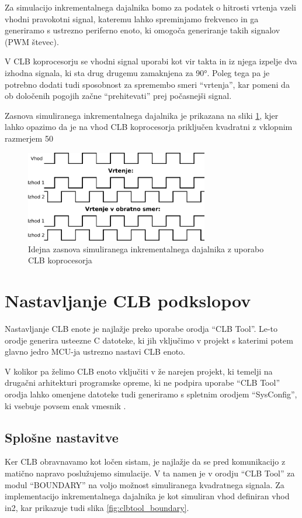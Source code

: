 \documentclass[a4paper]{article}
\begin{document}
\begin{sloppypar}
Za simulacijo inkrementalnega dajalnika bomo za podatek o hitrosti vrtenja vzeli vhodni pravokotni signal, kateremu lahko spreminjamo frekvenco in ga generiramo s ustrezno periferno enoto, ki omogoča generiranje takih signalov (PWM števec).

V CLB koprocesorju se vhodni signal uporabi kot vir takta in iz njega izpelje
dva izhodna signala, ki sta drug drugemu zamaknjena za 90°. Poleg
tega pa je potrebno dodati tudi sposobnost za spremembo smeri ``vrtenja'', kar
pomeni da ob določenih pogojih začne ``prehitevati'' prej počasnejši signal.

Zasnova simuliranega inkrementalnega dajalnika je prikazana na sliki
\ref{fig:enkoder_zasnova}, kjer lahko opazimo da je na vhod CLB koprocesorja
priključen kvadratni z vklopnim razmerjem 50%

\begin{figure}[htb]
    \centerline{\includegraphics[width=8cm]{enkoder_zasnova}}
    \caption{Idejna zasnova simuliranega inkrementalnega dajalnika z uporabo
             CLB koprocesorja}
    \label{fig:enkoder_zasnova} 
\end{figure} 


\section{Nastavljanje CLB podkslopov}\label{sec:nastavitve_podsklopov}
Nastavljanje CLB enote je najlažje preko uporabe orodja ``CLB Tool''. Le-to
orodje generira usteezne C datoteke, ki jih vključimo v projekt s katerimi potem glavno jedro MCU-ja
ustrezno nastavi CLB enoto. 

V kolikor pa želimo CLB enoto vključiti v že narejen projekt, ki temelji na drugačni
arhitekturi programske opreme, ki ne podpira uporabe ``CLB Tool'' orodja lahko omenjene 
datoteke tudi generiramo s spletnim orodjem ``SysConfig'', ki vsebuje povsem enak vmesnik \cite{sysconfig}.

\subsection{Splošne nastavitve}
Ker CLB obravnavamo kot ločen sistam, je najlažje da se pred komunikacijo z
matično napravo poslužujemo simulacije. V ta namen je v orodju ``CLB Tool'' za
modul ``BOUNDARY'' na voljo možnost simuliranega kvadratnega signala. Za
implementacijo inkrementalnega dajalnika je kot simuliran vhod definiran vhod
in2, kar prikazuje tudi slika \ref{fig:clbtool_boundary}.


\end{sloppypar}
\end{document}
